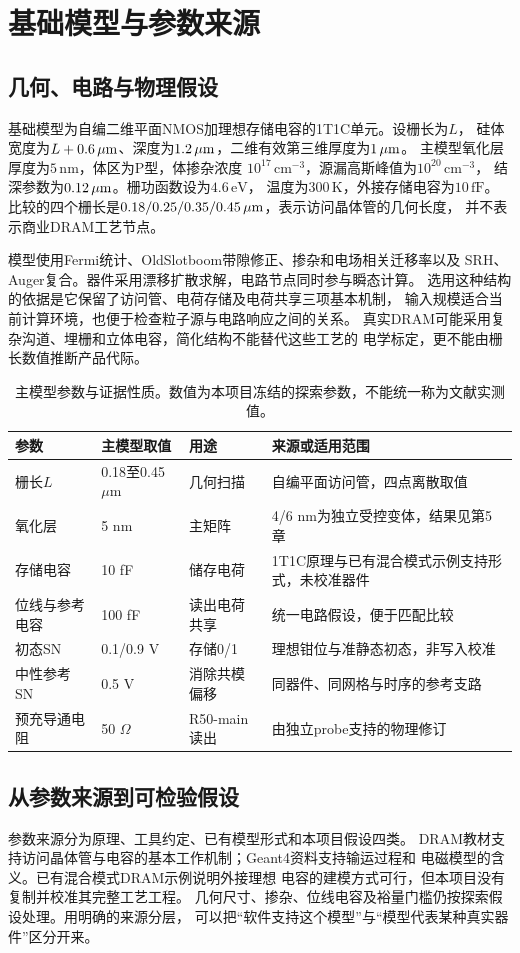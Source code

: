 \section{基础模型与参数来源}
\label{cr:model}
\subsection{几何、电路与物理假设}
基础模型为自编二维平面NMOS加理想存储电容的1T1C单元。设栅长为$L$，
硅体宽度为$L+0.6\,\mu\mathrm{m}$、深度为$1.2\,\mu\mathrm{m}$，二维有效第三维厚度为$1\,\mu\mathrm{m}$。
主模型氧化层厚度为$5\,\mathrm{nm}$，体区为P型，体掺杂浓度
$10^{17}\,\mathrm{cm}^{-3}$，源漏高斯峰值为$10^{20}\,\mathrm{cm}^{-3}$，
结深参数为$0.12\,\mu\mathrm{m}$。栅功函数设为$4.6\,\mathrm{eV}$，
温度为$300\,\mathrm{K}$，外接存储电容为$10\,\mathrm{fF}$。
比较的四个栅长是$0.18/0.25/0.35/0.45\,\mu\mathrm{m}$，表示访问晶体管的几何长度，
并不表示商业DRAM工艺节点。

模型使用Fermi统计、OldSlotboom带隙修正、掺杂和电场相关迁移率以及
SRH、Auger复合。器件采用漂移扩散求解，电路节点同时参与瞬态计算。
选用这种结构的依据是它保留了访问管、电荷存储及电荷共享三项基本机制，
输入规模适合当前计算环境，也便于检查粒子源与电路响应之间的关系。
真实DRAM可能采用复杂沟道、埋栅和立体电容，简化结构不能替代这些工艺的
电学标定，更不能由栅长数值推断产品代际。

\begin{table}[htbp]
\centering\small
\caption{主模型参数与证据性质。数值为本项目冻结的探索参数，不能统一称为文献实测值。}
\label{cr:parameters}
\begin{tabularx}{\textwidth}{lllX}
\toprule
参数&主模型取值&用途&来源或适用范围\\
\midrule
栅长$L$&0.18至0.45 $\mu$m&几何扫描&自编平面访问管，四点离散取值\\
氧化层&5 nm&主矩阵&4/6 nm为独立受控变体，结果见第5章\\
存储电容&10 fF&储存电荷&1T1C原理与已有混合模式示例支持形式，未校准器件\\
位线与参考电容&100 fF&读出电荷共享&统一电路假设，便于匹配比较\\
初态SN&0.1/0.9 V&存储0/1&理想钳位与准静态初态，非写入校准\\
中性参考SN&0.5 V&消除共模偏移&同器件、同网格与时序的参考支路\\
预充导通电阻&50 $\Omega$&R50-main读出&由独立probe支持的物理修订\\
\bottomrule
\end{tabularx}
\end{table}

\subsection{从参数来源到可检验假设}
参数来源分为原理、工具约定、已有模型形式和本项目假设四类。
DRAM教材支持访问晶体管与电容的基本工作机制；Geant4资料支持输运过程和
电磁模型的含义\cite{keeth2001,g4em}。已有混合模式DRAM示例说明外接理想
电容的建模方式可行，但本项目没有复制并校准其完整工艺工程。
几何尺寸、掺杂、位线电容及裕量门槛仍按探索假设处理。用明确的来源分层，
可以把“软件支持这个模型”与“模型代表某种真实器件”区分开来。

